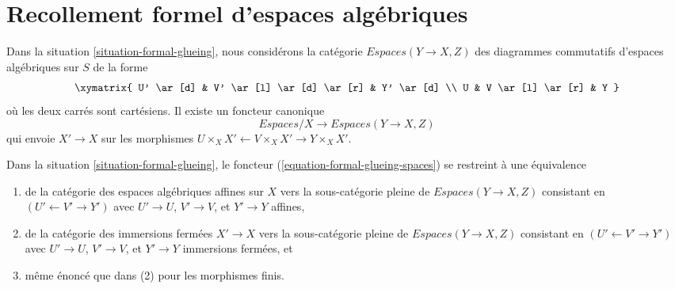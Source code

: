 \section{Recollement formel d'espaces algébriques}
\label{section-formal-glueing-spaces}

\noindent
Dans la situation \ref{situation-formal-glueing}, nous considérons la catégorie
$\textit{Espaces}(Y \to X, Z)$
des diagrammes commutatifs d'espaces algébriques sur $S$ de la forme
$$
\xymatrix{
U' \ar[d] & V' \ar[l] \ar[d] \ar[r] & Y' \ar[d] \\
U & V \ar[l] \ar[r] & Y
}
$$
où les deux carrés sont cartésiens. Il existe un foncteur canonique
\begin{equation}
\label{equation-formal-glueing-spaces}
\textit{Espaces}/X \longrightarrow \textit{Espaces}(Y \to X, Z)
\end{equation}
qui envoie $X' \to X$ sur les morphismes
$U \times_X X' \leftarrow V \times_X X' \rightarrow Y \times_X X'$.

\begin{lemma}
\label{lemma-equivalence-on-affine}
Dans la situation \ref{situation-formal-glueing}, le foncteur
(\ref{equation-formal-glueing-spaces}) se restreint à une
équivalence
\begin{enumerate}
\item de la catégorie des espaces algébriques affines sur $X$
vers la sous-catégorie pleine de $\textit{Espaces}(Y \to X, Z)$ consistant
en $(U' \leftarrow V' \rightarrow Y')$ avec $U' \to U$, $V' \to V$,
et $Y' \to Y$ affines,
\item de la catégorie des immersions fermées $X' \to X$
vers la sous-catégorie pleine de $\textit{Espaces}(Y \to X, Z)$ consistant
en $(U' \leftarrow V' \rightarrow Y')$ avec $U' \to U$, $V' \to V$,
et $Y' \to Y$ immersions fermées, et
\item même énoncé que dans (2) pour les morphismes finis.
\end{enumerate}
\end{lemma}

